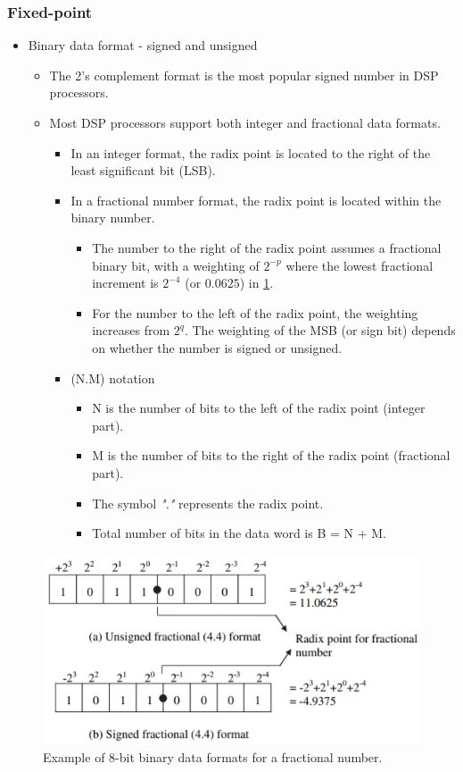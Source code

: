 \subsubsection{Fixed-point}

\begin{itemize}
	\item  Binary data format - signed and unsigned
	\begin{itemize}
		\item  The 2's complement format is	the most popular signed number in DSP processors.
		\item Most DSP processors support both integer and fractional data formats.
		\begin{itemize}
			\item  In an integer format, the radix point is located to the right of the least
			significant bit (LSB).
			\item In a fractional number format, the radix point is located within the binary number. 
			\begin{itemize}
				\item The number to the right	of the radix point assumes a fractional binary bit, with a weighting of $2^{-p}$ where the lowest fractional increment is $2^{−4}$ (or $0.0625$) in \ref{fig:1}.
				\item For the number to the left of the radix point, the weighting increases from $2^q$. The weighting of the MSB (or sign bit) depends on whether the number is signed or unsigned. 
			\end{itemize}
			\item (N.M) notation
			\begin{itemize}
				\item  N is the number of bits to the left of the radix point (integer part).
				\item M is the number of bits to the right of the radix point (fractional part). 
				\item The symbol \textit{"."} represents the radix point. 
				\item Total number of bits in the data word is B = N + M. 
			\end{itemize}
		\end{itemize}
	\end{itemize}
\end{itemize}

\begin{figure} [H]
	\centering
	\includegraphics[width=0.85\linewidth]{graphics/1.png}
	\caption{Example of 8-bit binary data formats for a fractional number.}
	\label{fig:1}
\end{figure}

